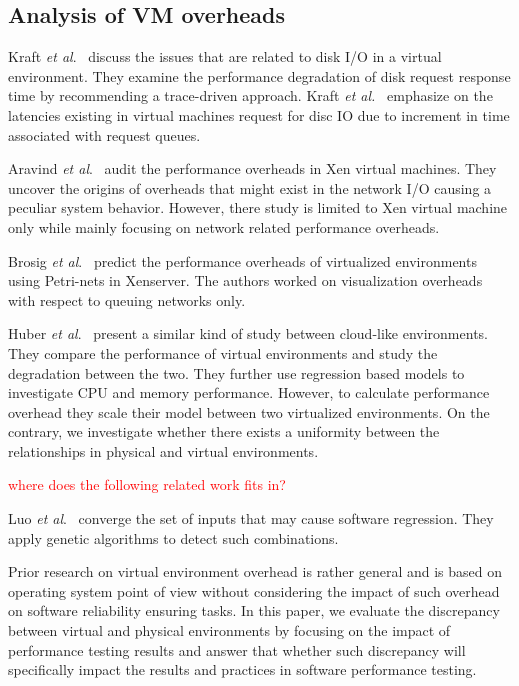 \subsection{Analysis of VM overheads}

Kraft \textit{et al$.$}~\cite{kraft2011io} discuss the issues that are related to disk I/O in a virtual environment. They examine the performance degradation of disk request response time by recommending a trace-driven approach. Kraft \textit{et al.}~\cite{kraft2011io} emphasize on the latencies existing in virtual machines request for disc IO due to increment in time associated with request queues. 

Aravind \textit{et al$.$}~\cite{menon2005diagnosing} audit the performance overheads in Xen virtual machines. They uncover the origins of overheads that might exist in the network I/O causing a peculiar system behavior. However, there study is limited to Xen virtual machine only while mainly focusing on network related performance overheads.

Brosig \textit{et al$.$}~\cite{brosig2013evaluating} predict the performance overheads of virtualized environments using Petri-nets in Xenserver. The authors worked on visualization overheads with respect to queuing networks only.


Huber \textit{et al$.$}~\cite{huber2011evaluating} present a similar kind of study between cloud-like environments. They compare the performance of virtual environments and study the degradation between the two. They further use regression based models to investigate CPU and memory performance. However, to calculate performance overhead they scale their model between two virtualized environments. On the contrary, we investigate whether there exists a uniformity between the relationships in physical and virtual environments.  

\textcolor{red}{where does the following related work fits in?}

Luo \textit{et al$.$}~\cite{Luo:2016:MPR:2901739.2901765} converge the set of inputs that may cause software regression. They apply genetic algorithms to detect such combinations. 

Prior research on virtual environment overhead is rather general and is based on operating system point of view without considering the impact of such overhead on software reliability ensuring tasks. In this paper, we evaluate the discrepancy between virtual and physical environments by focusing on the impact of performance testing results and answer that whether such discrepancy will specifically impact the results and practices in software  performance testing.  


